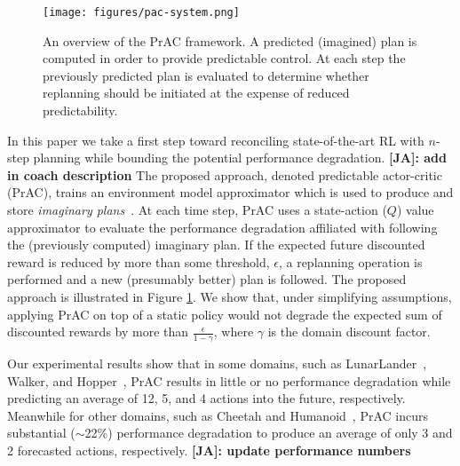 \documentclass[letterpaper]{article} %
\newcommand{\JA}[1] {{\color{red} \textbf{[JA]: #1}}}
\begin{document}
        \begin{figure}
            \texttt{[image: figures/pac-system.png]}
            \caption{An overview of the PrAC framework. A predicted (imagined) plan is computed in order to provide predictable control. At each step the previously predicted plan is evaluated to determine whether replanning should be initiated at the expense of reduced predictability.}
            \label{pac-system}
        \end{figure}

        In this paper we take a first step toward reconciling state-of-the-art RL with $n$-step planning while bounding the potential performance degradation. \JA{add in coach description}
        The proposed approach, denoted predictable actor-critic (PrAC), trains an environment model approximator which is used to produce and store \textit{imaginary plans}~\cite{racaniere2017imagination}. At each time step, PrAC uses a state-action ($Q$) value approximator to evaluate the performance degradation affiliated with following the (previously computed) imaginary plan. If the expected future discounted reward is reduced by more than some threshold, $\epsilon$, a replanning operation is performed and a new (presumably better) plan is followed. The proposed approach is illustrated in Figure \ref{pac-system}.  We show that, under simplifying assumptions, applying PrAC on top of a static policy would not degrade the expected sum of discounted rewards by more than $\frac{\epsilon}{1-\gamma}$, where $\gamma$ is the domain discount factor.

        Our experimental results show that in some domains, such as LunarLander~\cite{gym}, Walker, and Hopper~\cite{pybullet}, PrAC results in little or no performance degradation while predicting an average of 12, 5, and 4 actions into the future, respectively. Meanwhile for other domains, such as Cheetah and Humanoid~\cite{pybullet}, PrAC incurs substantial ($\sim$22\%) performance degradation to produce an average of only 3 and 2 forecasted actions, respectively.\JA{update performance numbers}
\end{document}
